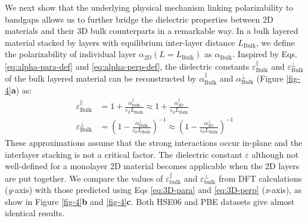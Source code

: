 \documentclass[journal=ancac3,manuscript=article,email=true,hyperref=true,keywords=false]{achemso}
\begin{document}

We next show that the underlying physical mechanism linking 
polarizability to bandgaps allows us to further bridge 
the dielectric properties between 2D materials and 
their 3D bulk counterparts in a remarkable way. 
%
%
%
In a bulk layered material stacked by layers with equilibrium
inter-layer distance $L_{\mathrm{Bulk}}$, we define the polarizability
of individual layer $\alpha_{\mathrm{2D}}(L=L_{\mathrm{Bulk}})$ as
$\alpha_{\mathrm{Bulk}}$. Inspired by Eqs. \ref{eq:alpha-para-def} and
\ref{eq:alpha-perp-def}, the dielectric constants
$\varepsilon^{\parallel}_{\mathrm{Bulk}}$ and
$\varepsilon^{\perp}_{\mathrm{Bulk}}$ of the bulk layered material can
be reconstructed by $\alpha_{\mathrm{Bulk}}^{\parallel}$ and
$\alpha_{\mathrm{Bulk}}^{\perp}$ (Figure \ref{fig-4}{\bf a}) as:
%
%
\begin{subequations}
\begin{align}
  \label{eq:3D-para}
  \varepsilon^{\parallel}_{\mathrm{Bulk}}
  &= 1 + \frac{\alpha_{\mathrm{bulk}}^{\parallel}}{\varepsilon_{0} L_{\mathrm{Bulk}}}
  \approx 1 + \frac{\alpha_{\mathrm{2D}}^{\parallel}}{\varepsilon_{0} L_{\mathrm{Bulk}}} \\
  \label{eq:3D-perp}
  \varepsilon^{\perp}_{\mathrm{Bulk}}
  &= \left(1 - \frac{\alpha_{\mathrm{Bulk}}^{\perp}}{\varepsilon_{0} L_{\mathrm{Bulk}}}\right)^{-1}
  \approx \left(1 - \frac{\alpha_{\mathrm{2D}}^{\perp}}{\varepsilon_{0} L_{\mathrm{Bulk}}}\right)^{-1}
\end{align}
\end{subequations}
%
%
These approximations assume that the strong interactions 
occur in-plane and the interlayer stacking is not a critical factor.
The dielectric constant $\varepsilon$ although not well-defined for
a monolayer 2D material becomes applicable when the 2D layers are
put together. 
%
We compare the values of
$\varepsilon_{\mathrm{bulk}}^{\parallel}$ and
$\varepsilon_{\mathrm{bulk}}^{\perp}$ from DFT calculations (\textit{y}-axis)
with those predicted using Eqs \ref{eq:3D-para} and \ref{eq:3D-perp}
(\textit{x}-axis), as show in Figure \ref{fig-4}{\bf b} and \ref{fig-4}{\bf c}. 
Both HSE06 and PBE datasets give almost identical results.  
\end{document}
